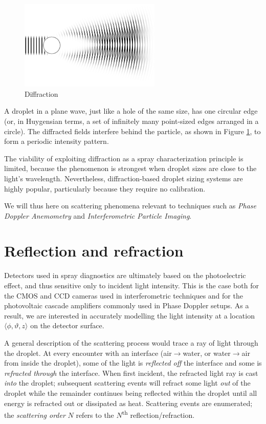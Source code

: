 \documentclass[11.5pt,oneside]{book}
\begin{document}
\begin{figure}
\centering
\includegraphics[width=0.6\textwidth]{img/scattering/diffraction.png}
\caption{Diffraction}
\label{fig:diffraction}
\end{figure}

A droplet in a plane wave, just like a hole of the same size, has one circular
edge (or, in Huygensian terms, a set of infinitely many point-sized edges arranged in a circle). The
diffracted fields interfere behind the particle, as shown in Figure
\ref{fig:diffraction}, to form a periodic intensity pattern.

The viability of exploiting diffraction as a spray characterization principle is
limited, because the phenomenon is strongest when droplet sizes are close to the
light's wavelength. Nevertheless, diffraction-based droplet sizing systems are
highly popular, particularly because they require no calibration.

We will thus here on scattering phenomena relevant to
techniques such as \emph{Phase Doppler Anemometry} and \emph{Interferometric
Particle Imaging}.

\section{Reflection and refraction}
Detectors used in spray diagnostics are ultimately based on the photoelectric
effect, and thus sensitive only to incident light intensity. This is the case
both for the \textsc{CMOS} and \textsc{CCD} cameras used in interferometric
techniques and for the photovoltaic cascade amplifiers commonly used in Phase
Doppler setups. As a result, we are interested in accurately modelling the light
intensity at a location $\langle \phi, \vartheta, z \rangle$ on the detector
surface.

A general description of the scattering process would trace a ray of light
through the droplet. At every encounter with an interface
(air$\rightarrow$water, or water$\rightarrow$air from inside the droplet), some of
the light is \emph{reflected off} the interface and some is \emph{refracted
through} the interface. When first incident, the refracted light ray is cast
\emph{into} the droplet; subsequent scattering events will refract some light
\emph{out} of the droplet while the remainder continues being reflected within the
droplet until all energy is refracted out or dissipated as heat. Scattering events
are enumerated; the \emph{scattering order} $N$ refers to the
$N$\textsuperscript{th} reflection/refraction.
\end{document}
